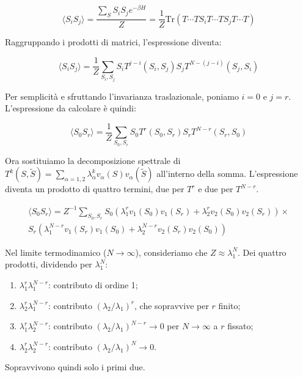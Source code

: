 \begin{equation}
\langle S_i S_j \rangle = \frac{\sum_{\underline{S}} S_i S_j e^{-\beta H}}{Z} = \frac{1}{Z} \text{Tr} \left( T \cdots T S_i T \cdots T S_j T \cdots T \right)
\end{equation}

Raggruppando i prodotti di matrici, l'espressione diventa:

\begin{equation}
\langle S_i S_j \rangle = \frac{1}{Z} \sum_{S_i, S_j} S_i T^{j-i}(S_i, S_j) S_j T^{N-(j-i)}(S_j, S_i)
\end{equation}

Per semplicità e sfruttando l'invarianza traslazionale, poniamo $i=0$ e $j=r$. L'espressione da calcolare è quindi:

\begin{equation}
\langle S_0 S_r \rangle = \frac{1}{Z} \sum_{S_0, S_r} S_0 T^r(S_0, S_r) S_r T^{N-r}(S_r, S_0)
\end{equation}

Ora sostituiamo la decomposizione spettrale di $T^k(S, \tilde{S}) = \sum_{\alpha=1,2} \lambda_\alpha^k v_\alpha(S) v_\alpha(\tilde{S})$ all'interno della somma. L'espressione diventa un prodotto di quattro termini, due per $T^r$ e due per $T^{N-r}$.

\begin{equation}
\begin{split}
\langle S_0 S_r \rangle = Z^{-1} \sum_{S_0, S_r} S_0 \left( \lambda_1^r v_1(S_0)v_1(S_r) + \lambda_2^r v_2(S_0)v_2(S_r) \right) \times \\
S_r \left( \lambda_1^{N-r} v_1(S_r)v_1(S_0) + \lambda_2^{N-r} v_2(S_r)v_2(S_0) \right)
\end{split}
\end{equation}

Nel limite termodinamico ($N \to \infty$), consideriamo che $Z \approx \lambda_1^N$. Dei quattro prodotti, dividendo per $\lambda_1^N$:
\begin{enumerate}
    \item $\lambda_1^r \lambda_1^{N-r}$: contributo di ordine 1;
    \item $\lambda_2^r \lambda_1^{N-r}$: contributo $(\lambda_2/\lambda_1)^r$, che sopravvive per $r$ finito;
    \item $\lambda_1^r \lambda_2^{N-r}$: contributo $(\lambda_2/\lambda_1)^{N-r} \to 0$ per $N \to \infty$ a $r$ fissato;
    \item $\lambda_2^r \lambda_2^{N-r}$: contributo $(\lambda_2/\lambda_1)^{N} \to 0$.
\end{enumerate}
Sopravvivono quindi solo i primi due.


